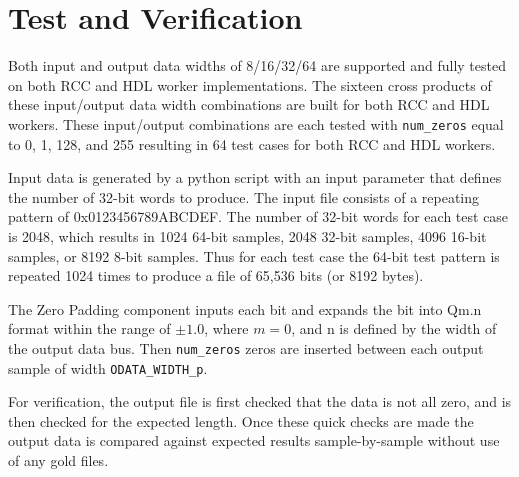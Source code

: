 \section*{Test and Verification}
\begin{flushleft}
	Both input and output data widths of 8/16/32/64 are supported and fully tested on both RCC and HDL worker implementations. The sixteen cross products of these input/output data width combinations are built for both RCC and HDL workers. These input/output combinations are each tested with \verb+num_zeros+ equal to 0, 1, 128, and 255 resulting in 64 test cases for both RCC and HDL workers.\medskip

	Input data is generated by a python script with an input parameter that defines the number of 32-bit words to produce. The input file consists of a repeating pattern of 0x0123456789ABCDEF. The number of 32-bit words for each test case is 2048, which results in 1024 64-bit samples, 2048 32-bit samples, 4096 16-bit samples, or 8192 8-bit samples. Thus for each test case the 64-bit test pattern is repeated 1024 times to produce a file of 65,536 bits (or 8192 bytes).\medskip

	The Zero Padding component inputs each bit and expands the bit into Qm.n format within the range of $\pm1.0$, where $m=0$, and n is defined by the width of the output data bus. Then \verb+num_zeros+ zeros are inserted between each output sample of width \verb+ODATA_WIDTH_p+.\medskip

	For verification, the output file is first checked that the data is not all zero, and is then checked for the expected length. Once these quick checks are made the output data is compared against expected results sample-by-sample without use of any gold files.
\end{flushleft}


